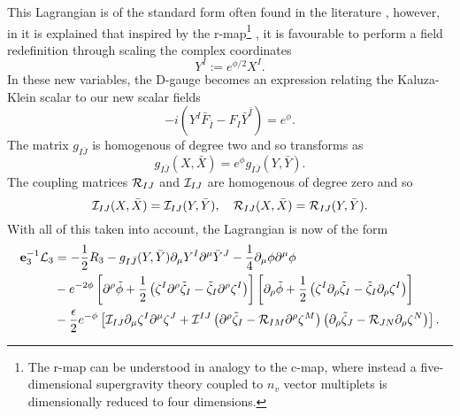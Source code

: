 This Lagrangian is of the standard form often found in the literature \cite{Ferrara:1989ik}, however, in \cite{Mohaupt:2011aa} it is explained that inspired by the r-map\footnote{The r-map can be understood in analogy to the c-map, where instead a five-dimensional supergravity theory coupled to $n_v$ vector multiplets is dimensionally reduced to four dimensions.} \cite{Cortes:2009cs}, it is favourable to perform a field redefinition through scaling the complex coordinates
\begin{equation}
Y^I := e^{\phi/2} X^I.
\end{equation}
In these new variables, the D-gauge becomes an expression relating the Kaluza-Klein scalar to our new scalar fields
\begin{equation}
-i(Y^I \bar{F}_{\bar{I}} - F_I\bar{Y}^{\bar{I}}) = e^\phi.
\end{equation}
The matrix $g_{I\bar{J}}$ is homogenous of degree two and so transforms as
\begin{equation}
g_{I\bar{J}}(X,\bar{X}) = e^\phi g_{I\bar{J}}(Y,\bar{Y}).
\end{equation}
The coupling matrices ${\cal R}_{IJ}$ and ${\cal I}_{IJ}$ are homogenous of degree zero and so
\begin{equation}
{\cal I}_{IJ}(X,\bar{X}) = {\cal I}_{IJ}(Y,\bar{Y}), \quad {\cal R}_{IJ}(X,\bar{X}) = {\cal R}_{IJ}(Y,\bar{Y}).
\end{equation}
With all of this taken into account, the Lagrangian  is now of the form
\begin{equation}
\label{eq:c4dl}
\begin{aligned}
 \mathbf{e}_3^{-1} {\cal L}_3 &= - \frac{1}{2}R_3 - g_{I\bar{J}}(Y,\bar{Y}) \partial_\mu Y^I \partial^\mu \bar{Y}^J - \frac{1}{4} \partial_\mu \phi \partial^\mu \phi \\
 &- e^{-2\phi} \left[ \partial^\rho \tilde{\phi} + \frac{1}{2} \left(\zeta^I \partial^\rho \tilde{\zeta}_I - \tilde{\zeta}_I \partial^\rho \zeta^I \right) \right] \left[ \partial_\rho \tilde{\phi} + \frac{1}{2} \left(\zeta^I \partial_\rho \tilde{\zeta}_I - \tilde{\zeta}_I \partial_\rho \zeta^I \right) \right] \\
 &- \frac{ \epsilon}{2} e^{-\phi} \left[{\cal I}_{IJ} \partial_\mu\zeta^I \partial^\mu \zeta^J + {\cal I}^{IJ} 
	\left(\partial^\rho \tilde{\zeta}_I - {\cal R}_{IM} \partial^\rho \zeta^M \right) 
	\left(\partial_\rho \tilde{\zeta}_J - {\cal R}_{JN} \partial_\rho \zeta^N \right) \right].
\end{aligned}
\end{equation}


